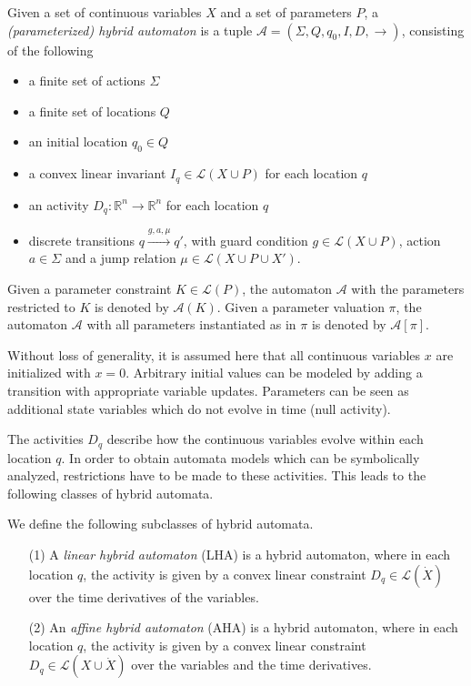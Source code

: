 \documentclass{llncs}
\newcommand{\A}{\ensuremath{\mathcal{A}}}
\newcommand{\Reals}{\ensuremath{\mathbb{R}}}
\begin{document}
\begin{definition}\label{def:lha}
  Given a set of continuous variables $X$ and a set of parameters $P$,
  a {\em (parameterized) hybrid automaton} is a tuple $\A = (\Sigma, Q, q_0,
  I, D, \rightarrow)$, consisting of the following
  \begin{itemize}
    \item a finite set of actions $\Sigma$
    \item a finite set of locations $Q$
    \item an initial location $q_0 \in Q$ %
    \item a convex linear invariant $I_q \in \mathcal{L}(X \cup P)$ for each
      location $q$
    \item an activity $D_q : \Reals^n \rightarrow \Reals^n$ for each
      location $q$ 
    \item discrete transitions $q \xrightarrow{g, a, \mu} q'$, with
      guard condition $g \in \mathcal{L}(X \cup P)$, action $a \in \Sigma$
      and a jump relation $\mu \in \mathcal{L}(X \cup P \cup X')$.
  \end{itemize}
  Given a parameter constraint $K \in \mathcal{L}(P)$, the automaton
  $\A$ with the parameters restricted to $K$ is denoted by
  $\A(K)$. Given a parameter valuation $\pi$, the automaton $\A$ with
  all parameters instantiated as in $\pi$ is denoted by $\A[\pi]$.
\end{definition}

Without loss of generality,
it is assumed here that all continuous variables $x$ are initialized
with $x=0$. Arbitrary initial values can be modeled by adding a
transition with appropriate variable updates.
Parameters can be seen as additional state variables which do
not evolve in time (null activity).

The activities $D_q$ describe how the continuous variables evolve
within each location $q$. In order to obtain automata models which can
be symbolically analyzed, restrictions have to be made to these
activities. This leads to the following classes of hybrid automata.

\begin{definition}
  We define the following subclasses of hybrid automata.

  \begin{itemize}
  \item[(1)] A \emph{linear hybrid automaton} (LHA) is a hybrid automaton,
    where in each location $q$, the activity is given by a convex
    linear constraint $D_q \in \mathcal{L}(\dot{X})$ over the time
    derivatives of the variables.

  \item[(2)] An \emph{affine hybrid automaton} (AHA) is a hybrid
    automaton, where in each location $q$, the activity is given by a
    convex linear constraint $D_q \in \mathcal{L}(X \cup \dot{X})$
    over the variables and the time derivatives.
  \end{itemize}
\end{definition}
\end{document}
